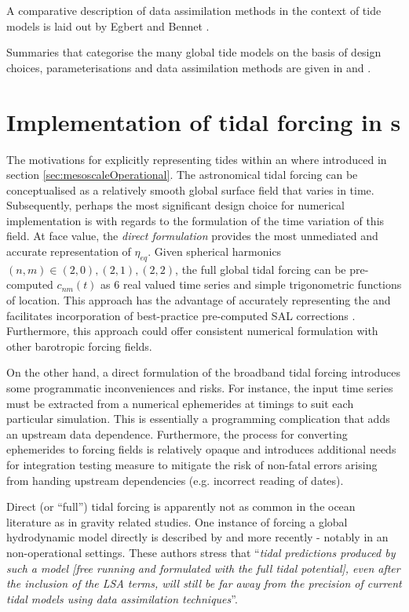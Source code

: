 A comparative description of data assimilation methods in the context of tide models is laid out by Egbert and Bennet \cite{Egbert:1996vr}.


Summaries that categorise the many global tide models on the basis of design choices, parameterisations and data assimilation methods are given in \cite{Ardalan:2008gs} and \cite{Matsumoto:2000tg}. 
\section{Implementation of tidal forcing in \OGCM{}s }
The motivations for explicitly representing tides within an \OGCM{} where introduced in section \ref{sec:mesoscaleOperational}. 
The astronomical tidal forcing can be conceptualised as a relatively smooth global surface field that varies in time. 
Subsequently, perhaps the most significant design choice for numerical implementation is with regards to the formulation of the time variation of this field.
At face value, the \emph{direct formulation} provides the most unmediated and accurate representation of $\eta_{eq}$. Given spherical harmonics $(n,m) \in (2,0) , (2,1) , (2,2)$, the full global tidal forcing can be pre-computed $c_{nm}(t)$ as 6 real valued time series and simple trigonometric functions of location.
This approach has the advantage of accurately representing the \ATGP{} and facilitates incorporation of best-practice pre-computed SAL corrections \citep{Egbert:2002ug}. 
Furthermore, this approach could offer consistent numerical formulation with other barotropic forcing fields.


On the other hand, a direct formulation of the broadband tidal forcing introduces some programmatic inconveniences and risks. 
For instance, the input time series must be extracted from a numerical ephemerides at timings to suit each particular simulation.  This is essentially a programming complication that adds an upstream data dependence.
Furthermore, the process for converting ephemerides to forcing fields is relatively opaque and introduces additional needs for integration testing measure to mitigate the risk of non-fatal errors arising from handing upstream dependencies (e.g. incorrect reading of dates).

Direct (or ``full'') tidal forcing is apparently not as common in the ocean literature as in gravity related studies. One instance of forcing a global hydrodynamic model directly is described by \cite{Weis:2008ex} and more recently \cite{Logemann:2020} - notably in an non-operational settings.   These authors stress that ``\textit{tidal predictions produced by such a model [free running and formulated with the full tidal potential], even after the inclusion of the LSA terms, will still be far away from the precision of current tidal models using data assimilation techniques}''.

